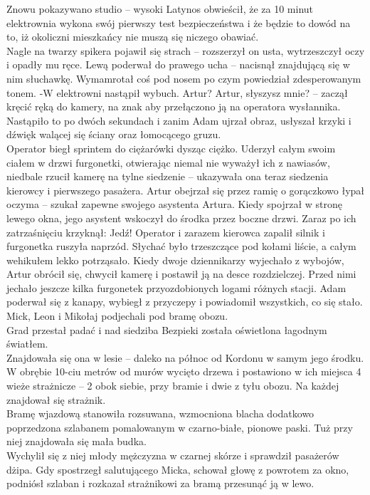 \documentclass[../MAIN.tex]{subfiles}
\begin{document}
Znowu pokazywano studio -- wysoki Latynos obwieścił, że za 10 minut elektrownia wykona swój pierwszy test bezpieczeństwa i że będzie to dowód na to, iż okoliczni mieszkańcy nie muszą się niczego obawiać. \\
Nagle na twarzy spikera pojawił się strach -- rozszerzył on usta, wytrzeszczył oczy i opadły mu ręce. Lewą poderwał do prawego ucha -- nacisnął znajdującą się w nim słuchawkę. Wymamrotał coś pod nosem po czym powiedział zdesperowanym tonem.
-W elektrowni nastąpił wybuch. Artur? Artur, słyszysz mnie? -- zaczął kręcić ręką do kamery, na znak aby przełączono ją na operatora wysłannika. \\
Nastąpiło to po dwóch sekundach i zanim Adam ujrzał obraz, usłyszał krzyki i dźwięk walącej się ściany oraz łomocącego gruzu. \\
Operator biegł sprintem do ciężarówki dysząc ciężko. Uderzył całym swoim ciałem w drzwi furgonetki, otwierając niemal nie wyważył ich z nawiasów, niedbale rzucił kamerę na tylne siedzenie -- ukazywała ona teraz siedzenia kierowcy i pierwszego pasażera.
Artur obejrzał się przez ramię o gorączkowo łypał oczyma -- szukał zapewne swojego asystenta Artura. Kiedy spojrzał w stronę lewego okna, jego asystent wskoczył do środka przez boczne drzwi. Zaraz po ich zatrzaśnięciu krzyknął:
\sx Jedź! \qd
Operator i zarazem kierowca zapalił silnik i furgonetka ruszyła naprzód. Słychać było trzeszczące pod kołami liście, a całym wehikułem lekko potrząsało. Kiedy dwoje dziennikarzy wyjechało z wybojów, Artur obrócił się, chwycił kamerę i postawił ją na desce rozdzielczej. Przed nimi jechało jeszcze kilka furgonetek przyozdobionych logami różnych stacji.
Adam poderwał się z kanapy, wybiegł z przyczepy i powiadomił wszystkich, co się stało.
%
%
Mick, Leon i Mikołaj podjechali pod bramę obozu.\\
Grad przestał padać i nad siedziba Bezpieki została oświetlona łagodnym światłem.\\
Znajdowała się ona w lesie -- daleko na północ od Kordonu w samym jego środku. W obrębie 10-ciu metrów od murów wycięto drzewa i postawiono w ich miejsca 4 wieże strażnicze -- 2 obok siebie, przy bramie i dwie z tyłu obozu. Na każdej znajdował się strażnik. \\
Bramę wjazdową stanowiła rozsuwana, wzmocniona blacha dodatkowo poprzedzona szlabanem pomalowanym w czarno-białe, pionowe paski. Tuż przy niej znajdowała się mała budka. \\
Wychylił się z niej młody mężczyzna w czarnej skórze i sprawdził pasażerów dżipa. Gdy spostrzegł salutującego Micka, schował głowę z powrotem za okno, podniósł szlaban i rozkazał strażnikowi za bramą przesunąć ją w lewo. \\
\end{document}

